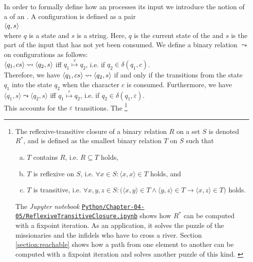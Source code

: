 In order to formally define how an  processes its input we introduce the notion of a
  of an .  A configuration
is defined as a pair
\\[0.2cm]
\hspace*{1.3cm}
$\pair(q, s)$
\\[0.2cm]
where  $q$ is a state and $s$ is a  string.  Here, $q$ is the current state of
the  and $s$ is the part of the input that has not yet been
consumed.  We define a binary relation
$\leadsto$ \index{$\leadsto$} on configurations as follows:
\\[0.2cm]
\hspace*{1.3cm}
$\pair(q_1, cs) \leadsto \pair(q_2, s)$ \quad iff \quad $q_1 \stackrel{c}{\mapsto} q_2$, \quad i.e. if $q_2 \in\delta(q_1, c)$.
\\[0.2cm]
Therefore, we have $\pair(q_1,cs) \leadsto \pair(q_2, s)$ if and only
if the  transitions from the state
$q_1$ into the state $q_2$ when the character $c$ is consumed.
Furthermore, we have
\\[0.2cm]
\hspace*{1.3cm}
$\langle q_1, s \rangle \leadsto \langle q_2, s \rangle$ \quad iff \quad $q_1 \stackrel{\varepsilon}{\mapsto}
q_2$, \quad i.e. if $q_2 \in \delta(q_1, \varepsilon)$.
\\[0.2cm]
This accounts for the $\varepsilon$ transitions.  The
\footnote{The reflexive-transitive
  closure of a binary relation $R$ on a set $S$ is denoted $R^*$, and is defined as the smallest binary
  relation $T$ on $S$ such that
  \begin{enumerate}[(a)]
  \item $T$ contains $R$, i.e. $R \subseteq T$ holds,
  \item $T$ is reflexive on $S$, i.e. $\forall x\in S: \langle x, x \rangle \in T$ holds, and
  \item $T$ is transitive, i.e.
   $\forall x,y,z\in S: \bigl(\langle x, y \rangle \in T \wedge \langle y, z \rangle \in T \rightarrow \langle
   x, z \rangle\in T\bigr)$
        holds.
  \end{enumerate}
  The \textsl{Jupyter notebook}
  \href{https://github.com/karlstroetmann/Formal-Languages/blob/master/Python/Chapter-04-05/ReflexiveTransitiveClosure.ipynb}{\texttt{Python/Chapter-04-05/ReflexiveTransitiveClosure.ipynb}}
  shows how $R^*$ can be computed with a fixpoint iteration.  As an application, it solves the puzzle of the
  missionaries and the infidels who have to cross a river.  Section \ref{section:reachable} shows how a path from
  one element to another can be computed with a fixpoint iteration and solves another puzzle of this kind.%
  \label{footnote:rtc}}
